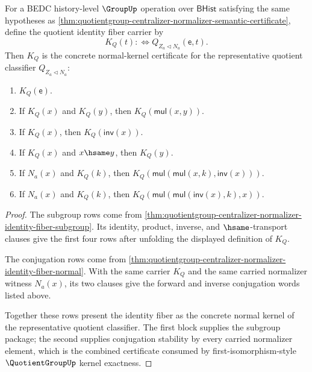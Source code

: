 \begin{theorem}
\label{thm:quotientgroup-centralizer-normalizer-kernel-certificate}
For a BEDC history-level $\GroupUp$ operation over $\mathsf{BHist}$ satisfying
the same hypotheses as
\autoref{thm:quotientgroup-centralizer-normalizer-semantic-certificate}, define
the quotient identity fiber carrier by
$$
K_Q(t) :\Longleftrightarrow Q_{Z_a\triangleleft N_a}(\mathsf{e},t).
$$
Then $K_Q$ is the concrete normal-kernel certificate for the representative
quotient classifier $Q_{Z_a\triangleleft N_a}$:
\begin{enumerate}
\item $K_Q(\mathsf{e})$.
\item If $K_Q(x)$ and $K_Q(y)$, then $K_Q(\mathsf{mul}(x,y))$.
\item If $K_Q(x)$, then $K_Q(\mathsf{inv}(x))$.
\item If $K_Q(x)$ and $x\hsame y$, then $K_Q(y)$.
\item If $N_a(x)$ and $K_Q(k)$, then
$K_Q(\mathsf{mul}(\mathsf{mul}(x,k),\mathsf{inv}(x)))$.
\item If $N_a(x)$ and $K_Q(k)$, then
$K_Q(\mathsf{mul}(\mathsf{mul}(\mathsf{inv}(x),k),x))$.
\end{enumerate}
\end{theorem}
\begin{proof}
The subgroup rows come from
\autoref{thm:quotientgroup-centralizer-normalizer-identity-fiber-subgroup}.
Its identity, product, inverse, and $\hsame$-transport clauses give the first
four rows after unfolding the displayed definition of $K_Q$.

The conjugation rows come from
\autoref{thm:quotientgroup-centralizer-normalizer-identity-fiber-normal}. With
the same carrier $K_Q$ and the same carried normalizer witness $N_a(x)$, its two
clauses give the forward and inverse conjugation words listed above.

Together these rows present the identity fiber as the concrete normal kernel of
the representative quotient classifier. The first block supplies the subgroup
package; the second supplies conjugation stability by every carried
normalizer element, which is the combined certificate consumed by
first-isomorphism-style $\QuotientGroupUp$ kernel exactness.
\end{proof}

